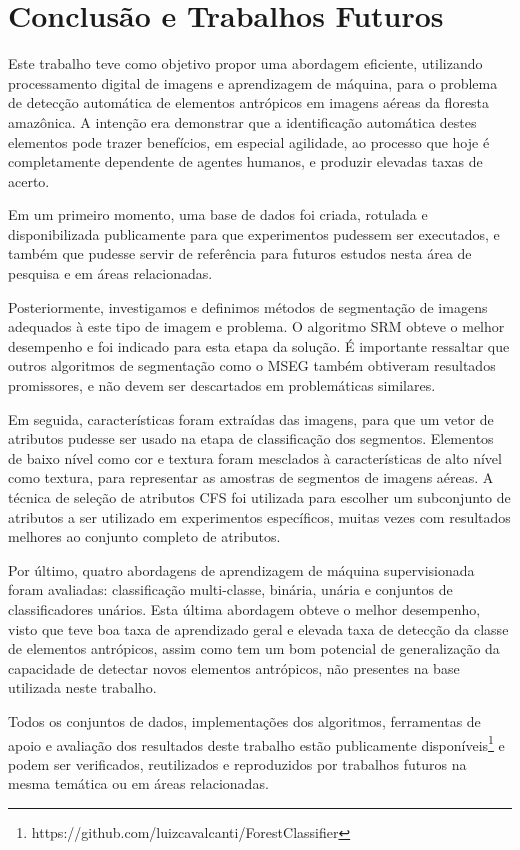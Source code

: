 \chapter{Conclusão e Trabalhos Futuros}\label{cap:conclusao}

Este trabalho teve como objetivo propor uma abordagem eficiente, utilizando processamento digital de imagens  e aprendizagem de máquina, para o problema de detecção automática de elementos antrópicos em imagens aéreas da floresta amazônica. A intenção era demonstrar que a identificação automática destes elementos pode trazer benefícios, em especial agilidade, ao processo que hoje é completamente dependente de agentes humanos, e produzir elevadas taxas de acerto.

Em um primeiro momento, uma base de dados foi criada, rotulada e disponibilizada publicamente para que experimentos pudessem ser executados, e também que pudesse servir de referência para futuros estudos nesta área de pesquisa e em áreas relacionadas.

Posteriormente, investigamos e definimos métodos de segmentação de imagens adequados à este tipo de imagem e problema. O algoritmo SRM obteve o melhor desempenho e foi indicado para esta etapa da solução. É importante ressaltar que outros algoritmos de segmentação como o MSEG também obtiveram resultados promissores, e não devem ser descartados em problemáticas similares.

Em seguida, características foram extraídas das imagens, para que um vetor de atributos pudesse ser usado na etapa de classificação dos segmentos. Elementos de baixo nível como cor e textura foram mesclados à características de alto nível como textura, para representar as amostras de segmentos de imagens aéreas. A técnica de seleção de atributos CFS foi utilizada para escolher um subconjunto de atributos a ser utilizado em experimentos específicos, muitas vezes com resultados melhores ao conjunto completo de atributos.

Por último, quatro abordagens de aprendizagem de máquina supervisionada foram avaliadas: classificação multi-classe, binária, unária e conjuntos de classificadores unários. Esta última abordagem obteve o melhor desempenho, visto que teve boa taxa de aprendizado geral e elevada taxa de detecção da classe de elementos antrópicos, assim como tem um bom potencial de generalização da capacidade de detectar novos elementos antrópicos, não presentes na base utilizada neste trabalho.

Todos os conjuntos de dados, implementações dos algoritmos, ferramentas de apoio e avaliação dos resultados deste trabalho estão publicamente disponíveis\footnote{https://github.com/luizcavalcanti/ForestClassifier} e podem ser verificados, reutilizados e reproduzidos por trabalhos futuros na mesma temática ou em áreas relacionadas.

